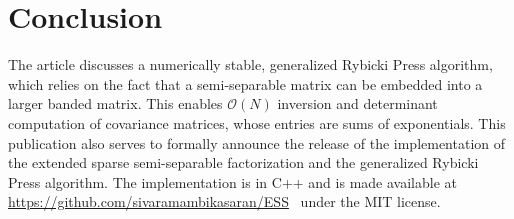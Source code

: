 \documentclass[final,leqno]{siamltex}
\begin{document}
\section{Conclusion}
The article discusses a numerically stable, generalized Rybicki Press algorithm, which relies on the fact that a semi-separable matrix can be embedded into a larger banded matrix. This enables $\mathcal{O}(N)$ inversion and determinant computation of covariance matrices, whose entries are sums of exponentials. This publication also serves to formally announce the release of the implementation of the extended sparse semi-separable factorization and the generalized Rybicki Press algorithm. The implementation is in C++ and is made available at \url{https://github.com/sivaramambikasaran/ESS}~\cite{ambikasaran2014ESS} under the MIT license.

\FloatBarrier


\newpage
% 
% 
\end{document}
